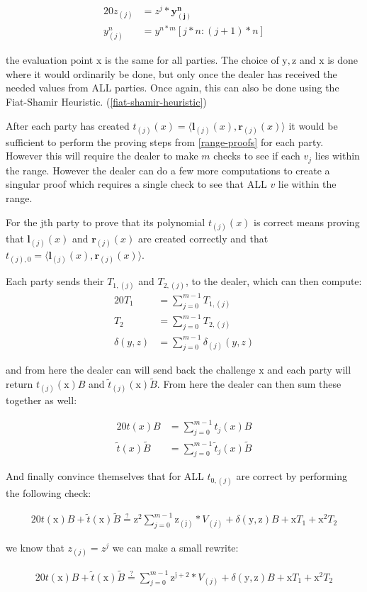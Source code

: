 \documentclass{article}
\newcommand{\eq}[1]{\begin{alignat*}{20}#1\end{alignat*}}
\renewcommand{\vec}[1]{\boldsymbol{#1}}
\newcommand{\ran}[1]{\mathrm{#1}}
\newcommand{\tB}{\widetilde{B}}
\renewcommand{\tt}{\widetilde{t}}
\newcommand{\dotp}[2]{\langle #1, #2 \rangle}
\begin{document}
\eq{
	z_{(j)} &= z^j * \vec{y^n_{(j)}}\\
	y^n_{(j)} &= y^{n*m}[j*n:(j+1)*n]
}

the evaluation point $\ran{x}$ is the same for all parties. The choice of $\ran{y}, \ran{z}$ and $\ran{x}$ is done where it would ordinarily be done, but only once the dealer has received the needed values from ALL parties. Once again, this can also be done using the Fiat-Shamir Heuristic. (\ref{fiat-shamir-heuristic}) 

After each party has created $t_{(j)}(x) = \dotp{\vec{l}_{(j)}(x)}{\vec{r}_{(j)}(x)}$ it would be sufficient to perform the proving steps from \ref{range-proofs} for each party. However this will require the dealer to make $m$ checks to see if each $v_j$ lies within the range. However the dealer can do a few more computations to create a singular proof which requires a single check to see that ALL $v$ lie within the range.

For the jth party to prove that its polynomial $t_{(j)}(x)$ is correct means proving that $\vec{l}_{(j)}(x)$ and $\vec{r}_{(j)}(x)$ are created correctly and that $t_{(j), 0} = \dotp{\vec{l}_{(j)}(x)}{\vec{r}_{(j)}(x)}$. 

Each party sends their $T_{1,(j)}$ and $T_{2,(j)}$, to the dealer, which can then compute:
\eq{
	T_1 &= \sum^{m-1}_{j = 0} T_{1,(j)}\\
	T_2 &= \sum^{m-1}_{j = 0} T_{2,(j)}\\
	\delta(y,z) &= \sum^{m-1}_{j = 0} \delta_{(j)}(y,z)
}

and from here the dealer can will send back the challenge $\ran{x}$ and each party will return $t_{(j)}(\ran{x})B$ and $\tt_{(j)}(\ran{x})\tB$. From here the dealer can then sum these together as well:

\eq{
t(x)B &= \sum^{m-1}_{j = 0} t_{j}(x)B\\
\tt(x)\tB &= \sum^{m-1}_{j = 0} \tt_{j}(x)\tB
}

And finally convince themselves that for ALL $t_{0,(j)}$ are correct by performing the following check: 

\eq{
	t(\ran{x})B + \widetilde{t}(\ran{x})\widetilde{B} \stackrel{?}{=} \ran{z^2}\sum^{m-1}_{j = 0} \ran{z_{(j)}}*V_{(j)} + \delta(\ran{y},\ran{z})B + \ran{x}T_1 + \ran{x^2}T_2
}

we know that $z_{(j)} = z^j$ we can make a small rewrite:

\eq{
	t(\ran{x})B + \widetilde{t}(\ran{x})\widetilde{B} \stackrel{?}{=} \sum^{m-1}_{j = 0} \ran{z^{j+2}}*V_{(j)} + \delta(\ran{y},\ran{z})B + \ran{x}T_1 + \ran{x^2}T_2
}
\end{document}

